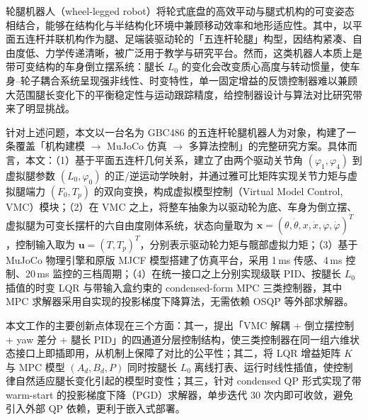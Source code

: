 \documentclass{smbuthesis}
\begin{document}
\setcounter{page}{1}
\pagestyle{fancy}



\cleardoublepage
{}
\printchinesetoc

\cleardoublepage
{}
\printrussiantoc

\begin{abstractZH}
\setlength{\parindent}{2em}

轮腿机器人（wheel-legged robot）将轮式底盘的高效平动与腿式机构的可变姿态相结合，能够在结构化与半结构化环境中兼顾移动效率和地形适应性。其中，以平面五连杆并联机构作为腿、足端装驱动轮的「五连杆轮腿」构型，因结构紧凑、自由度低、力学传递清晰，被广泛用于教学与研究平台。然而，这类机器人本质上是带可变结构的车身倒立摆系统：腿长 $L_0$ 的变化会改变质心高度与转动惯量，使车身--轮子耦合系统呈现强非线性、时变特性，单一固定增益的反馈控制器难以兼顾大范围腿长变化下的平衡稳定性与运动跟踪精度，给控制器设计与算法对比研究带来了明显挑战。

针对上述问题，本文以一台名为 GBC486 的五连杆轮腿机器人为对象，构建了一条覆盖「机构建模 $\to$ MuJoCo 仿真 $\to$ 多算法控制」的完整研究方案。具体而言，本文：（1）基于平面五连杆几何关系，建立了由两个驱动关节角 $(\varphi_1, \varphi_4)$ 到虚拟腿参数 $(L_0, \varphi_0)$ 的正/逆运动学映射，并通过雅可比矩阵实现关节力矩与虚拟腿端力 $(F_0, T_p)$ 的双向变换，构成虚拟模型控制（Virtual Model Control, VMC）模块；（2）在 VMC 之上，将整车抽象为以驱动轮为底、车身为倒立摆、虚拟腿为可变长摆杆的六自由度刚体系统，状态向量取为 $\mathbf{x} = (\theta, \dot\theta, x, \dot x, \varphi, \dot\varphi)^T$，控制输入取为 $\mathbf{u} = (T, T_p)^T$，分别表示驱动轮力矩与髋部虚拟力矩；（3）基于 MuJoCo 物理引擎和原版 MJCF 模型搭建了仿真平台，采用 1\,ms 传感、4\,ms 控制、20\,ms 监控的三档周期；（4）在统一接口之上分别实现级联 PID、按腿长 $L_0$ 插值的时变 LQR 与带输入盒约束的 condensed-form MPC 三类控制器，其中 MPC 求解器采用自实现的投影梯度下降算法，无需依赖 OSQP 等外部求解器。

本文工作的主要创新点体现在三个方面：其一，提出「VMC 解耦 + 倒立摆控制 + yaw 差分 + 腿长 PID」的四通道分层控制结构，使三类控制器在同一组六维状态接口上即插即用，从机制上保障了对比的公平性；其二，将 LQR 增益矩阵 $K$ 与 MPC 模型 $(A_d, B_d, P)$ 同时按腿长 $L_0$ 离线打表、运行时线性插值，使控制律自然适应腿长变化引起的模型时变性；其三，针对 condensed QP 形式实现了带 warm-start 的投影梯度下降（PGD）求解器，单步迭代 30 次内即可收敛，避免引入外部 QP 依赖，更利于嵌入式部署。


\end{abstractZH}
\end{document}
